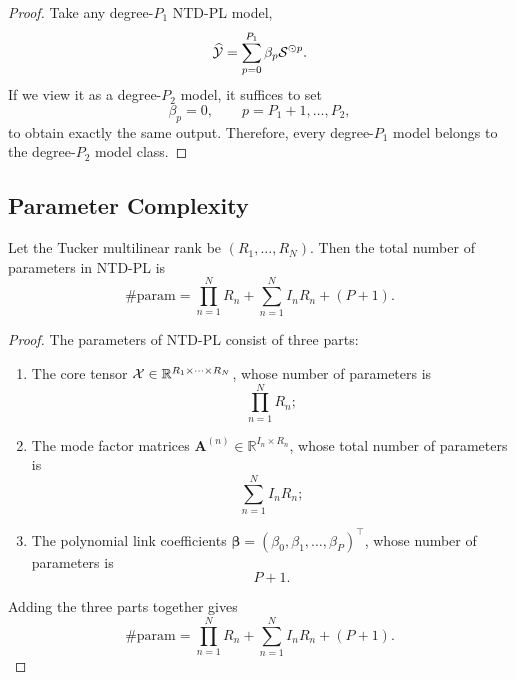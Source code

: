 \begin{proof}
Take any degree-$P_1$ NTD-PL model,
\begin{equation}
\widehat{\mathcal{Y}}
=
\sum_{p=0}^{P_1}\beta_p \mathcal{S}^{\odot p}.
\end{equation}
If we view it as a degree-$P_2$ model, it suffices to set
\begin{equation}
\beta_p=0,\qquad p=P_1+1,\dots,P_2,
\end{equation}
to obtain exactly the same output. Therefore, every degree-$P_1$ model belongs to the degree-$P_2$ model class.
\end{proof}

\subsection{Parameter Complexity}

\begin{proposition}
\label{prop:param_complexity_app}
Let the Tucker multilinear rank be $(R_1,\dots,R_N)$. Then the total number of parameters in NTD-PL is
\begin{equation}
\#\mathrm{param}
=
\prod_{n=1}^{N}R_n
+
\sum_{n=1}^{N}I_nR_n
+
(P+1).
\end{equation}
\end{proposition}

\begin{proof}
The parameters of NTD-PL consist of three parts:

\begin{enumerate}
    \item The core tensor $\mathcal{X}\in\mathbb{R}^{R_1\times\cdots\times R_N}$, whose number of parameters is
    \begin{equation}
    \prod_{n=1}^{N}R_n;
    \end{equation}

    \item The mode factor matrices $\mathbf A^{(n)}\in\mathbb{R}^{I_n\times R_n}$, whose total number of parameters is
    \begin{equation}
    \sum_{n=1}^{N}I_nR_n;
    \end{equation}

    \item The polynomial link coefficients $\boldsymbol\beta=(\beta_0,\beta_1,\dots,\beta_P)^\top$, whose number of parameters is
    \begin{equation}
    P+1.
    \end{equation}
\end{enumerate}

Adding the three parts together gives
\begin{equation}
\#\mathrm{param}
=
\prod_{n=1}^{N}R_n
+
\sum_{n=1}^{N}I_nR_n
+
(P+1).
\end{equation}
\end{proof}

